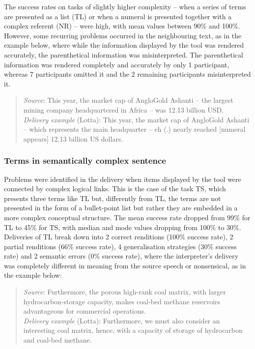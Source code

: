 The success rates on tasks of slightly higher complexity -- when a series of terms are presented as a list (TL) or when a numeral is presented together with a complex referent (NR) -- were high, with mean values between 90\% and 100\%. However, some recurring problems occurred in the neighbouring text, as in the example below, where while the information displayed by the tool was rendered accurately, the parenthetical information was misinterpreted. The parenthetical information was rendered completely and accurately by only 1 participant, whereas 7 participants omitted it and the 2 remaining participants misinterpreted it.
\begin{quote}
    \textit{Source}: This year, the market cap of AngloGold Ashanti -- the largest mining company headquartered in Africa -- was 12.13 billion USD.\\
\textit{Delivery example} (Lotta): This year, the market cap of AngloGold Ashanti -- which represents the main headquarter -- eh (.) nearly reached [numeral appears] 12.13 billion US dollars.
\end{quote}




\subsubsection{Terms in semantically complex sentence}

Problems were identified in the delivery when items displayed by the tool were connected by complex logical links. This is the case of the task TS, which presents three terms like TL but, differently from TL, the terms are not presented in the form of a bullet-point list but rather they are embedded in a more complex conceptual structure. The mean success rate dropped from 99\% for TL to 45\% for TS, with median and mode values dropping from 100\% to 30\%. Deliveries of TL break down into 2 correct renditions (100\% success rate), 2 partial renditions (66\% success rate), 4 generalisation strategies (30\% success rate) and 2 semantic errors (0\% success rate), where the interpreter’s delivery was completely different in meaning from the source speech or nonsensical, as in the example below:
\begin{quote}
    \textit{Source}: Furthermore, the porous high-rank coal matrix, with larger hy\-dro\-car\-bon\nobreakdash-stor\-age capacity, makes coal-bed methane reservoirs advantageous for commercial operations.\\
\textit{Delivery example} (Lotta): Furthermore, we must also consider an interesting coal matrix, hence, with a capacity of storage of hydrocarbon and coal-bed methane.
\end{quote}


